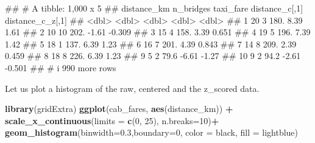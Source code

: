 \documentclass[
]{book}
\newenvironment{Shaded}{\begin{snugshade}}{\end{snugshade}}
\newcommand{\AttributeTok}[1]{\textcolor[rgb]{0.13,0.29,0.53}{#1}}
\newcommand{\DecValTok}[1]{\textcolor[rgb]{0.00,0.00,0.81}{#1}}
\newcommand{\FloatTok}[1]{\textcolor[rgb]{0.00,0.00,0.81}{#1}}
\newcommand{\FunctionTok}[1]{\textcolor[rgb]{0.13,0.29,0.53}{\textbf{#1}}}
\newcommand{\NormalTok}[1]{#1}
\newcommand{\SpecialCharTok}[1]{\textcolor[rgb]{0.81,0.36,0.00}{\textbf{#1}}}
\newcommand{\StringTok}[1]{\textcolor[rgb]{0.31,0.60,0.02}{#1}}
\begin{document}
\begin{Shaded}
\begin{Highlighting}[]
\NormalTok{\#\# \# A tibble: 1,000 x 5}
\NormalTok{\#\#    distance\_km n\_bridges taxi\_fare distance\_c[,1] distance\_c\_z[,1]}
\NormalTok{\#\#          \textless{}dbl\textgreater{}     \textless{}dbl\textgreater{}     \textless{}dbl\textgreater{}          \textless{}dbl\textgreater{}            \textless{}dbl\textgreater{}}
\NormalTok{\#\#  1          20         3     180.            8.39            1.61 }
\NormalTok{\#\#  2          10        10     202.           {-}1.61           {-}0.309}
\NormalTok{\#\#  3          15         4     158.            3.39            0.651}
\NormalTok{\#\#  4          19         5     196.            7.39            1.42 }
\NormalTok{\#\#  5          18         1     137.            6.39            1.23 }
\NormalTok{\#\#  6          16         7     201.            4.39            0.843}
\NormalTok{\#\#  7          14         8     209.            2.39            0.459}
\NormalTok{\#\#  8          18         8     226.            6.39            1.23 }
\NormalTok{\#\#  9           5         2      79.6          {-}6.61           {-}1.27 }
\NormalTok{\#\# 10           9         2      94.2          {-}2.61           {-}0.501}
\NormalTok{\#\# \# i 990 more rows}
\end{Highlighting}
\end{Shaded}

Let us plot a histogram of the raw, centered and the z\_scored data.

\begin{Shaded}
\begin{Highlighting}[]
\FunctionTok{library}\NormalTok{(gridExtra)}
\FunctionTok{ggplot}\NormalTok{(cab\_fares, }\FunctionTok{aes}\NormalTok{(distance\_km)) }\SpecialCharTok{+}
        \FunctionTok{scale\_x\_continuous}\NormalTok{(}\AttributeTok{limits =} \FunctionTok{c}\NormalTok{(}\DecValTok{0}\NormalTok{, }\DecValTok{25}\NormalTok{), }\AttributeTok{n.breaks=}\DecValTok{10}\NormalTok{)}\SpecialCharTok{+}
        \FunctionTok{geom\_histogram}\NormalTok{(}\AttributeTok{binwidth=}\FloatTok{0.3}\NormalTok{,}\AttributeTok{boundary=}\DecValTok{0}\NormalTok{,}
                       \AttributeTok{color =} \StringTok{\textquotesingle{}black\textquotesingle{}}\NormalTok{,}
                       \AttributeTok{fill =} \StringTok{\textquotesingle{}lightblue\textquotesingle{}}\NormalTok{)}
\end{Highlighting}
\end{Shaded}
\end{document}
